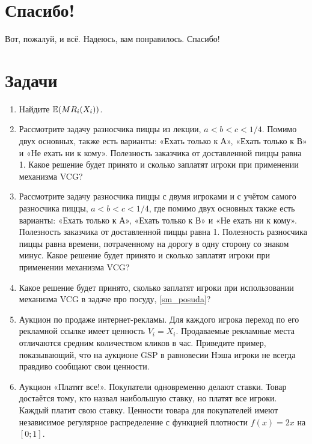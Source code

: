 \section{Спасибо!}

Вот, пожалуй, и всё. Надеюсь, вам понравилось. Спасибо!



\section{Задачи}

\begin{enumerate}
\item Найдите $ \operatorname{\mathbb{E}}(MR_{i}(X_{i})) $.

\item Рассмотрите задачу разносчика пиццы из лекции, $ a<b<c<1/4 $. Помимо двух основных, также есть варианты: «Ехать только к А», «Ехать только к В» и «Не ехать ни к кому». Полезность заказчика от доставленной пиццы равна 1. Какое решение будет принято и сколько заплатят игроки при применении механизма VCG?

\item Рассмотрите задачу разносчика пиццы с двумя игроками и с учётом самого разносчика пиццы, $ a<b<c<1/4 $, где помимо двух основных также есть варианты: «Ехать только к А», «Ехать только к В» и «Не ехать ни к кому». Полезность заказчика от доставленной пиццы равна 1. Полезность разносчика пиццы равна времени, потраченному на дорогу в одну сторону со знаком минус. Какое решение будет принято и сколько заплатят игроки при применении механизма VCG?

\item Какое решение будет принято, сколько заплатят игроки при использовании механизма VCG в задаче про посуду, \ref{sm_posuda}?

\item Аукцион по продаже интернет-рекламы. Для каждого игрока переход по его рекламной ссылке имеет ценность $ V_{i}=X_{i} $. Продаваемые рекламные места отличаются средним количеством кликов в час. Приведите пример, показывающий, что на аукционе GSP в равновесии Нэша игроки не всегда правдиво сообщают свои ценности.

\item Аукцион «Платят все!». Покупатели одновременно делают ставки. Товар достаётся
тому, кто назвал наибольшую ставку, но платят все игроки. Каждый платит свою
ставку. Ценности товара для покупателей имеют независимое регулярное распределение с функцией плотности $ f(x)=2x $ на $ [0;1] $.


\end{enumerate}

